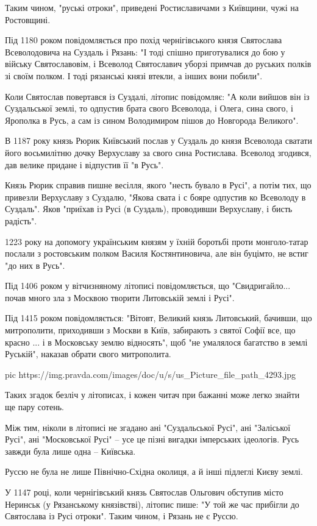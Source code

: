 Таким чином, "руські отроки", приведені Ростиславичами з Київщини, чужі на
Ростовщині.

Під 1180 роком повідомляється про похід чернігівського князя Святослава
Всеволодовича на Суздаль і Рязань: "І тоді спішно приготувалися до бою у
війську Святославовім, і Всеволод Святославич уборзі примчав до руських полків
зі своїм полком. І тоді рязанські князі втекли, а інших вони побили".

Коли Святослав повертався із Суздалі, літопис повідомляє: "А коли вийшов він із
Суздальської землі, то одпустив брата свого Всеволода, і Олега, сина свого, і
Ярополка в Русь, а сам із сином Володимиром пішов до Новгорода Великого".

В 1187 року князь Рюрик Київський послав у Суздаль до князя Всеволода сватати
його восьмилітню дочку Верхуславу за свого сина Ростислава. Всеволод згодився,
дав велике придане і відпустив її "в Русь".

Князь Рюрик справив пишне весілля, якого "несть бувало в Русі", а потім тих, що
привезли Верхуславу з Суздалю, "Якова свата і с бояре одпустив ко Всеволоду в
Суздаль". Яков "приїхав із Русі (в Суздаль), проводивши Верхуславу, і бисть
радість".

1223 року на допомогу українським князям у їхній боротьбі проти монголо-татар
послали з ростовським полком Василя Костянтиновича, але він буцімто, не встиг
"до них в Русь".

Під 1406 роком у вітчизняному літописі повідомляється, що "Свидригайло... почав
много зла з Москвою творити Литовській землі і Русі".

Під 1415 роком повідомляється: "Вітовт, Великий князь Литовський, бачивши, що
митрополити, приходивши з Москви в Київ, забирають з святої Софії все, що
красно ... і в Московську землю відносять", щоб "не умалялося багатство в землі
Руській", наказав обрати свого митрополита.

\ifcmt
pic https://img.pravda.com/images/doc/u/s/us_Picture_file_path_4293.jpg
\fi

Таких згадок безліч у літописах, і кожен читач при бажанні може легко знайти ще
пару сотень.

Між тим, ніколи в літописі не згадано ані "Суздальської Русі", ані "Заліської
Русі", ані "Московської Русі" – усе це пізні вигадки імперських ідеологів. Русь
завжди була лише одна – Київська.

Руссю не була не лише Північно-Східна околиця, а й інші підлеглі Києву землі.

У 1147 році, коли чернігівський князь Святослав Ольгович обступив місто
Неринськ (у Рязанському князівстві), літопис пише: "У той же час прибігли до
Святослава із Русі отроки". Таким чином, і Рязань не є Руссю.

